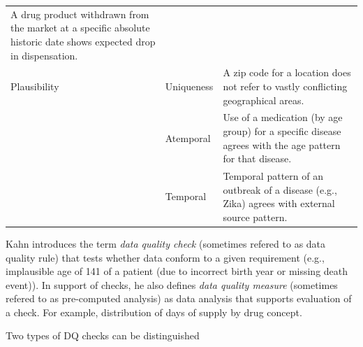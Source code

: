\documentclass[11pt]{book}
\theoremstyle{definition}
\theoremstyle{definition}
\theoremstyle{definition}
\theoremstyle{remark}
\begin{document}
\begin{longtable}[]{@{}lll@{}}
\begin{minipage}[t]{0.67\columnwidth}
A drug product withdrawn from the market at a specific absolute historic date shows expected drop in dispensation.\strut
\end{minipage}\tabularnewline
\begin{minipage}[t]{0.08\columnwidth}\raggedright
Plausibility\strut
\end{minipage} & \begin{minipage}[t]{0.16\columnwidth}\raggedright
Uniqueness\strut
\end{minipage} & \begin{minipage}[t]{0.67\columnwidth}\raggedright
A zip code for a location does not refer to vastly conflicting geographical areas.\strut
\end{minipage}\tabularnewline
\begin{minipage}[t]{0.08\columnwidth}\raggedright
\strut
\end{minipage} & \begin{minipage}[t]{0.16\columnwidth}\raggedright
Atemporal\strut
\end{minipage} & \begin{minipage}[t]{0.67\columnwidth}\raggedright
Use of a medication (by age group) for a specific disease agrees with the age pattern for that disease.\strut
\end{minipage}\tabularnewline
\begin{minipage}[t]{0.08\columnwidth}\raggedright
\strut
\end{minipage} & \begin{minipage}[t]{0.16\columnwidth}\raggedright
Temporal\strut
\end{minipage} & \begin{minipage}[t]{0.67\columnwidth}\raggedright
Temporal pattern of an outbreak of a disease (e.g., Zika) agrees with external source pattern.\strut
\end{minipage}\tabularnewline
\bottomrule
\end{longtable}

Kahn introduces the term \emph{data quality check} (sometimes refered to as data quality rule) that tests whether data conform to a given requirement (e.g., implausible age of 141 of a patient (due to incorrect birth year or missing death event)). In support of checks, he also defines \emph{data quality measure} (sometimes refered to as pre-computed analysis) as data analysis that supports evaluation of a check. For example, distribution of days of supply by drug concept.

Two types of DQ checks can be distinguished\citep{weiskopf_methods_2013}
\end{document}
